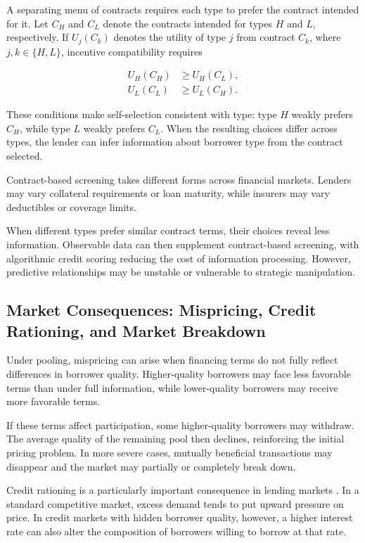 A separating menu of contracts requires each type to prefer the contract intended for it. Let $C_H$ and $C_L$ denote the contracts intended for types $H$ and $L$, respectively. If $U_j(C_k)$ denotes the utility of type $j$ from contract $C_k$, where $j,k\in\{H,L\}$, incentive compatibility requires

\begin{equation}
\begin{aligned}
U_H(C_H) &\geq U_H(C_L),\\
U_L(C_L) &\geq U_L(C_H).
\end{aligned}
\label{eq:ch3-screening-ic}
\end{equation}

These conditions make self-selection consistent with type: type $H$ weakly prefers $C_H$, while type $L$ weakly prefers $C_L$. When the resulting choices differ across types, the lender can infer information about borrower type from the contract selected.

Contract-based screening takes different forms across financial markets. Lenders may vary collateral requirements or loan maturity, while insurers may vary deductibles or coverage limits.

When different types prefer similar contract terms, their choices reveal less information. Observable data can then supplement contract-based screening, with algorithmic credit scoring reducing the cost of information processing. However, predictive relationships may be unstable or vulnerable to strategic manipulation.

\subsection{Market Consequences: Mispricing, Credit Rationing, and Market Breakdown}

Under pooling, mispricing can arise when financing terms do not fully reflect differences in borrower quality. Higher-quality borrowers may face less favorable terms than under full information, while lower-quality borrowers may receive more favorable terms.

If these terms affect participation, some higher-quality borrowers may withdraw. The average quality of the remaining pool then declines, reinforcing the initial pricing problem. In more severe cases, mutually beneficial transactions may disappear and the market may partially or completely break down.

Credit rationing is a particularly important consequence in lending markets \cite{StiglitzWeiss1981}. In a standard competitive market, excess demand tends to put upward pressure on price. In credit markets with hidden borrower quality, however, a higher interest rate can also alter the composition of borrowers willing to borrow at that rate.

